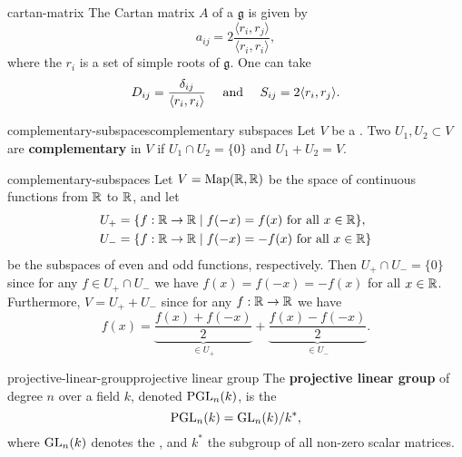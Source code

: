 \begin{example}{cartan-matrix}
    The Cartan matrix $A$ of a  $\mathfrak{g}$ is given by
    \[ a_{ij} = 2 \frac{\langle r_i, r_j \rangle}{\langle r_i, r_i \rangle} , \]
    where the $r_i$ is a set of simple roots of $\mathfrak{g}$. One can take
    \[ D_{ij} = \frac{\delta_{ij}}{\langle r_i, r_i \rangle} \quad \textup{ and } \quad S_{ij} = 2 \langle r_i, r_j \rangle . \]
\end{example}

\begin{topic}{complementary-subspaces}{complementary subspaces}
    Let $V$ be a . Two  $U_1, U_2 \subset V$ are \textbf{complementary} in $V$ if $U_1 \cap U_2 = \{ 0 \}$ and $U_1 + U_2 = V$.
\end{topic}

\begin{example}{complementary-subspaces}
    Let $V = \textup{Map}(\mathbb{R}, \mathbb{R})$ be the space of continuous functions from $\mathbb{R}$ to $\mathbb{R}$, and let
    \[ \begin{aligned}
        U_+ &= \{ f : \mathbb{R} \to \mathbb{R} \;|\; f(-x) = f(x) \textup{ for all } x \in \mathbb{R} \}, \\
        U_- &= \{ f : \mathbb{R} \to \mathbb{R} \;|\; f(-x) = -f(x) \textup{ for all } x \in \mathbb{R} \}
    \end{aligned} \]
    be the subspaces of even and odd functions, respectively. Then $U_+ \cap U_- = \{ 0 \}$ since for any $f \in U_+ \cap U_-$ we have $f(x) = f(-x) = -f(x)$ for all $x \in \mathbb{R}$. Furthermore, $V = U_+ + U_-$ since for any $f : \mathbb{R} \to \mathbb{R}$ we have
    \[ f(x) = \underbrace{\frac{f(x) + f(-x)}{2}}_{\in U_+} + \underbrace{\frac{f(x) - f(-x)}{2}}_{\in U_-} . \]
\end{example}

\begin{topic}{projective-linear-group}{projective linear group}
    The \textbf{projective linear group} of degree $n$ over a field $k$, denoted $\textup{PGL}_n(k)$, is the 
    \[ \textup{PGL}_n(k) = \textup{GL}_n(k) / k^* , \]
    where $\textup{GL}_n(k)$ denotes the , and $k^*$ the subgroup of all non-zero scalar matrices.
\end{topic}


